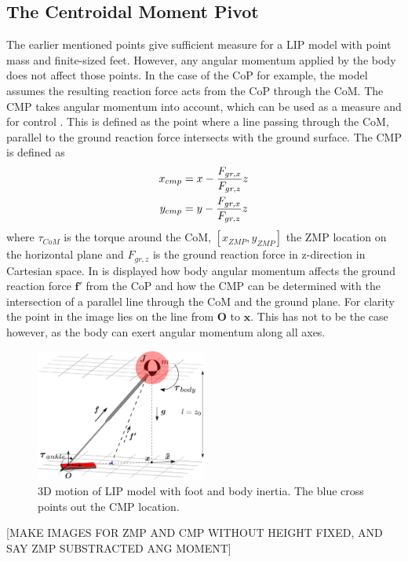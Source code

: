 \subsection{The Centroidal Moment Pivot}
The earlier mentioned points give sufficient measure for a \ac{LIP} model with point mass and finite-sized feet. However, any angular momentum applied by the body does not affect those points. In the case of the \ac{CoP} for example, the model assumes the resulting reaction force acts from the \ac{CoP} through the \ac{CoM}. The \ac{CMP} takes angular momentum into account, which can be used as a measure and for control \cite{popovic2005ground}. This is defined as the point where a line passing through the \ac{CoM}, parallel to the ground reaction force intersects with the ground surface. The \ac{CMP} is defined as
\begin{align}
    x_{cmp}&=x-\frac{F_{gr,x}}{F_{gr,z}}z\\
    y_{cmp}&=y-\frac{F_{gr,x}}{F_{gr,z}}z
\end{align}
where $\tau_{CoM}$ is the torque around the \ac{CoM}, $[x_{ZMP},y_{ZMP}]$ the \ac{ZMP} location on the horizontal plane and $F_{gr,z}$ is the ground reaction force in z-direction in Cartesian space. In  is displayed how body angular momentum affects the ground reaction force $\boldsymbol{f'}$ from the \ac{CoP} and how the \ac{CMP} can be determined with the intersection of a parallel line through the \ac{CoM} and the ground plane. For clarity the point in the image lies on the line from $\boldsymbol{O}$ to $\boldsymbol{x}$. This has not to be the case however, as the body can exert angular momentum along all axes. 
\begin{figure}[h]
\centering
\includegraphics[width=0.5\textwidth]{STYLESTUFF/3DCoMwithfootinertia.png}
\caption{\ac{3D} motion of \ac{LIP} model with foot and body inertia. The blue cross points out the \ac{CMP} location.}
\label{fig:3dlipfootinertia}
\end{figure}
[MAKE IMAGES FOR ZMP AND CMP WITHOUT HEIGHT FIXED, AND SAY ZMP SUBSTRACTED ANG MOMENT]


